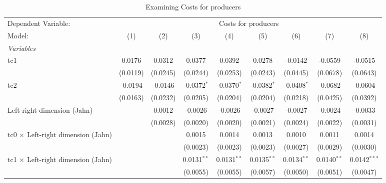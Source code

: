 
\begin{table}[htbp]
   \caption{Examining Costs for producers}
   \centering
   \begin{tabular}{lcccccccc}
      \tabularnewline \midrule \midrule
      Dependent Variable: & \multicolumn{8}{c}{Costs for producers}\\
      Model:                                    & (1)      & (2)      & (3)           & (4)           & (5)           & (6)           & (7)           & (8)\\  
      \midrule
      \emph{Variables}\\
      tc1                                       & 0.0176   & 0.0312   & 0.0377        & 0.0392        & 0.0278        & -0.0142       & -0.0559       & -0.0515\\   
                                                & (0.0119) & (0.0245) & (0.0244)      & (0.0253)      & (0.0243)      & (0.0445)      & (0.0678)      & (0.0643)\\   
      tc2                                       & -0.0194  & -0.0146  & -0.0372$^{*}$ & -0.0370$^{*}$ & -0.0382$^{*}$ & -0.0408$^{*}$ & -0.0682       & -0.0604\\   
                                                & (0.0163) & (0.0232) & (0.0205)      & (0.0204)      & (0.0204)      & (0.0218)      & (0.0425)      & (0.0392)\\   
      Left-right dimension (Jahn)               &          & 0.0012   & -0.0026       & -0.0026       & -0.0027       & -0.0027       & -0.0024       & -0.0033\\   
                                                &          & (0.0028) & (0.0020)      & (0.0020)      & (0.0021)      & (0.0024)      & (0.0022)      & (0.0031)\\   
      tc0 $\times$ Left-right dimension (Jahn)  &          &          & 0.0015        & 0.0014        & 0.0013        & 0.0010        & 0.0011        & 0.0014\\   
                                                &          &          & (0.0023)      & (0.0023)      & (0.0023)      & (0.0027)      & (0.0029)      & (0.0030)\\   
      tc1 $\times$ Left-right dimension (Jahn)  &          &          & 0.0131$^{**}$ & 0.0131$^{**}$ & 0.0135$^{**}$ & 0.0134$^{**}$ & 0.0140$^{**}$ & 0.0142$^{***}$\\   
                                                &          &          & (0.0055)      & (0.0055)      & (0.0057)      & (0.0050)      & (0.0051)      & (0.0047)\\   

\end{tabular}
\end{table}
